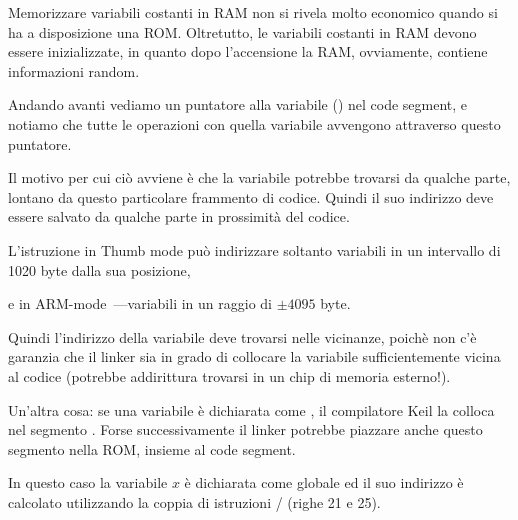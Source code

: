 Memorizzare variabili costanti in RAM non si rivela molto economico quando si ha a disposizione una ROM.
Oltretutto, le variabili costanti in RAM devono essere inizializzate, in quanto dopo l'accensione la RAM, ovviamente, contiene informazioni random.


Andando avanti vediamo un puntatore alla variabile  () nel code segment, e notiamo che tutte le operazioni con quella variabile avvengono attraverso questo puntatore.

Il motivo per cui ciò avviene è che la variabile  potrebbe trovarsi da qualche parte, lontano da questo particolare frammento di codice. Quindi il suo indirizzo deve essere salvato da qualche parte in prossimità del codice.

L'istruzione  in Thumb mode può indirizzare soltanto variabili in un intervallo di 1020 byte dalla sua posizione, 

e in ARM-mode~---variabili in un raggio di $\pm{}4095$ byte.

Quindi l'indirizzo della variabile  deve trovarsi nelle vicinanze, poichè non c'è garanzia che il linker sia in grado di collocare la variabile sufficientemente vicina al codice (potrebbe addirittura trovarsi in un chip di memoria esterno!).

\myindex{\ROM}

Un'altra cosa: se una variabile è dichiarata come , il compilatore Keil la colloca nel segmento .
Forse successivamente il linker potrebbe piazzare anche questo segmento nella ROM, insieme al code segment.





In questo caso la variabile $x$ è dichiarata come globale ed il suo indirizzo è calcolato utilizzando la coppia di istruzioni 
/ (righe 21 e 25).

